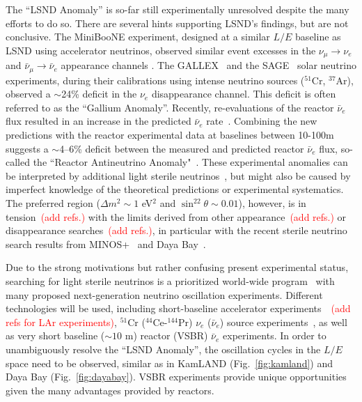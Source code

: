 The ``LSND Anomaly'' is so-far still experimentally unresolved despite the many efforts to do so. 
There are several hints supporting LSND's findings, but are not conclusive.
The MiniBooNE experiment, designed at a similar $L/E$ baseline as LSND using accelerator neutrinos, observed similar event excesses in the $\nu_{\mu}\rightarrow\nu_e$ and $\bar\nu_{\mu}\rightarrow\bar\nu_e$ appearance channels \cite{MiniBooNE2013}. 
The GALLEX~\cite{GALLEX2010} and the SAGE~\cite{SAGE2009} solar neutrino experiments, during their calibrations using intense neutrino sources ($^{51}$Cr, $^{37}$Ar), observed a $\sim$24\% deficit in the $\nu_e$ disappearance channel. 
This deficit is often referred to as the ``Gallium Anomaly''. 
Recently, re-evaluations of the reactor $\bar\nu_e$ flux resulted in an increase in the predicted $\bar\nu_e$ rate~\cite{Mueller, Huber}. 
Combining the new predictions with the reactor experimental data at baselines between 10-100m suggests a $\sim$4--6\% deficit between the measured and predicted reactor $\bar\nu_e$ flux, so-called the ``Reactor Antineutrino Anomaly"~\cite{Mention2011,Zhang13}. 
These experimental anomalies can be interpreted by additional light sterile neutrinos~\cite{Guinti2011}, but might also be caused by imperfect knowledge of the theoretical predictions or experimental systematics.  
The preferred region ($\Delta{m}^2\sim1$ eV$^2$ and $\sin^22\theta\sim0.01$), however, is in tension~\textcolor{red}{(add refs.)} with the limits derived from other appearance~\textcolor{red}{(add refs.)} or disappearance searches~\textcolor{red}{(add refs.)}, in particular with the recent sterile neutrino search results from MINOS+~\cite{Sousa-Neutrino14} and Daya Bay~\cite{DayaBaySterile}.

Due to the strong motivations but rather confusing present experimental status, searching for light sterile neutrinos is a prioritized world-wide program~\cite{sterileWP} with many proposed next-generation neutrino oscillation experiments.
Different technologies will be used, including short-baseline accelerator experiments~\cite{nuSTORM,IsoDAR}~\textcolor{red}{(add refs for LAr experiments)}, $^{51}$Cr ($^{44}$Ce-$^{144}$Pr) $\nu_e$ ($\bar\nu_e$) source experiments~\cite{Cribier2011,Dwyer2013,SOX,CeLAND}, as well as very short baseline ($\sim10$ m) reactor (VSBR) $\bar\nu_e$ experiments. 
In order to unambiguously resolve the ``LSND Anomaly'', the oscillation cycles in the $L/E$ space need to be observed, similar as in KamLAND (Fig.~\ref{fig:kamland}) and Daya Bay (Fig.~\ref{fig:dayabay}). VSBR experiments provide unique opportunities given the many advantages provided by reactors.

